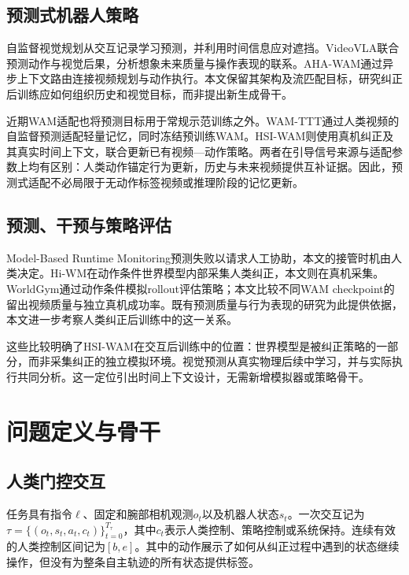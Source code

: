 \documentclass[letterpaper,10pt,conference]{ieeeconf}
\begin{document}
\subsection{预测式机器人策略}
自监督视觉规划从交互记录学习预测，并利用时间信息应对遮挡\cite{temporalplanning}。VideoVLA联合预测动作与视觉后果，分析想象未来质量与操作表现的联系\cite{videovla}。AHA-WAM通过异步上下文路由连接视频规划与动作执行\cite{ahawam}。本文保留其架构及流匹配目标\cite{flow}，研究纠正后训练应如何组织历史和视觉目标，而非提出新生成骨干。

近期WAM适配也将预测目标用于常规示范训练之外。WAM-TTT通过人类视频的自监督预测适配轻量记忆，同时冻结预训练WAM\cite{wamttt}。HSI-WAM则使用真机纠正及其真实时间上下文，联合更新已有视频—动作策略。两者在引导信号来源与适配参数上均有区别：人类动作锚定行为更新，历史与未来视频提供互补证据。因此，预测式适配不必局限于无动作标签视频或推理阶段的记忆更新。

\subsection{预测、干预与策略评估}
Model-Based Runtime Monitoring预测失败以请求人工协助\cite{monitor}，本文的接管时机由人类决定。Hi-WM在动作条件世界模型内部采集人类纠正\cite{hiwm}，本文则在真机采集。WorldGym通过动作条件模拟rollout评估策略\cite{worldgym}；本文比较不同WAM checkpoint的留出视频质量与独立真机成功率。既有预测质量与行为表现的研究\cite{modelspixels,videovla}为此提供依据，本文进一步考察人类纠正后训练中的这一关系。

这些比较明确了HSI-WAM在交互后训练中的位置：世界模型是被纠正策略的一部分，而非采集纠正的独立模拟环境。视觉预测从真实物理后续中学习，并与实际执行共同分析。这一定位引出时间上下文设计，无需新增模拟器或策略骨干。

\section{问题定义与骨干}

\subsection{人类门控交互}

任务具有指令$\ell$、固定和腕部相机观测$o_t$以及机器人状态$s_t$。一次交互记为$\tau=\{(o_t,s_t,a_t,c_t)\}_{t=0}^{T_\tau}$，其中$c_t$表示人类控制、策略控制或系统保持。连续有效的人类控制区间记为$[b,e]$。其中的动作展示了如何从纠正过程中遇到的状态继续操作，但没有为整条自主轨迹的所有状态提供标签。
\end{document}

